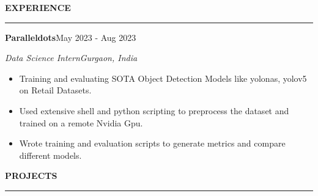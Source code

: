 \documentclass[a4paper,12pt]{report}
\begin{document}
 \par
 \vspace{9pt}
 
\noindent 
\textbf{EXPERIENCE} \par
\vspace{2pt}
\hrule
\vspace{6pt}


\noindent 
\textbf{Paralleldots}{\fontsize{9pt}{9pt}\selectfont \hfill  {\fontsize{12pt}{12pt}\selectfont May 2023 - Aug 2023}} \par
\noindent 
{\fontsize{12pt}{12pt}\selectfont \textit{Data Science Intern}\hfill\textit{Gurgaon, India}} \par
\noindent 
\begin{itemize}[noitemsep,topsep=0pt]
    \item {\fontsize{12pt}{12pt}\selectfont Training and evaluating SOTA Object Detection Models like yolonas, yolov5 on Retail Datasets.} \par
    \noindent
    \item {\fontsize{12pt}{12pt}\selectfont Used extensive shell and python scripting to preprocess the dataset and trained on a remote Nvidia Gpu.} \par
    \noindent 
    \item {\fontsize{12pt}{12pt}\selectfont Wrote training and evaluation scripts to generate metrics and compare different models. } \par
    \noindent
\end{itemize}



 \par
\vspace{9pt}



\noindent 
\textbf{PROJECTS} \par
\vspace{2pt}
\hrule
\vspace{6pt}
\end{document}
